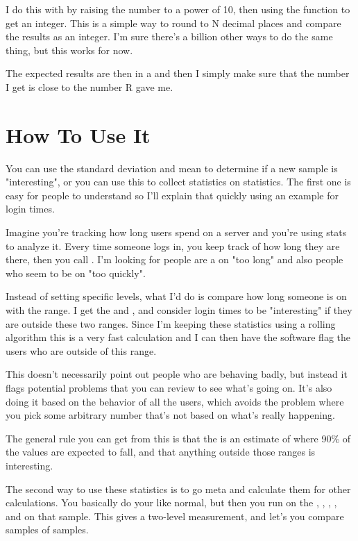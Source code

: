 I do this with  by raising the number to a power of 10, then using
the  function to get an integer.  This is a simple way to round
to N decimal places and compare the results as an integer.  I'm sure there's
a billion other ways to do the same thing, but this works for now.

The expected results are then in a   and then
I simply make sure that the number I get is close to the number R gave me.

\section{How To Use It}

You can use the standard deviation and mean to determine if a new sample
is "interesting", or you can use this to collect statistics on statistics.  The 
first one is easy for people to understand so I'll explain that quickly
using an example for login times.

Imagine you're tracking how long users spend on a server and you're using
stats to analyze it.  Every time someone logs in, you keep track of 
how long they are there, then you call .  I'm looking
for people are a on "too long" and also people who seem to be on "too quickly".

Instead of setting specific levels, what I'd do is compare how long someone
is on with the  range.  I get the
 and , and consider login times to be "interesting"
if they are outside these two ranges.  Since I'm keeping these statistics
using a rolling algorithm this is a very fast calculation and I can then have
the software flag the users who are outside of this range.

This doesn't necessarily point out people who are behaving badly, but instead
it flags potential problems that you can review to see what's going on.  It's
also doing it based on the behavior of all the users, which avoids the problem
where you pick some arbitrary number that's not based on what's really happening.

The general rule you can get from this is that the  is an estimate of where 90\% of the values are expected to fall, and that
anything outside those ranges is interesting.

The second way to use these statistics is to go meta and calculate them for
other  calculations.  You basically do your 
like normal, but then you run  on the , 
, , , and  on that sample.
This gives a two-level measurement, and let's you compare samples of samples.

